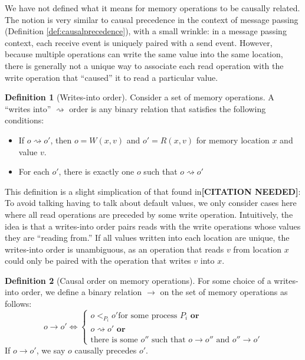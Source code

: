 \documentclass[]             %
{NASA}                       %
\theoremstyle{definition}
\newtheorem{definition}{Definition}[section]
\newcommand{\citationneeded}{\textbf{[CITATION NEEDED]}}
\begin{document}
We have not defined what it means for memory operations to be causally
related. The notion is very similar to causal precedence in the
context of message passing (Definition \ref{def:causalprecedence}),
with a small wrinkle: in a message passing context, each receive event
is uniquely paired with a send event. However, because multiple
operations can write the same value into the same location, there is
generally not a unique way to associate each read operation with the
write operation that ``caused'' it to read a particular value.

\begin{definition}[Writes-into order]
  Consider a set of memory operations. A ``writes into''
  $\rightsquigarrow$ order is any binary relation that satisfies the
  following conditions:
  \begin{itemize}
  \item If $o \rightsquigarrow o'$, then $o = W(x, v)$ and $o' = R(x,v)$ for memory location $x$ and value $v$.
  \item For each $o'$, there is exactly one $o$ such that $o \rightsquigarrow o'$
  \end{itemize}
\end{definition}

This definition is a slight simplication of that found
in\citationneeded: To avoid talking having to talk about default
values, we only consider cases here where all read operations are
preceded by some write operation. Intuitively, the idea is that a
writes-into order pairs reads with the write operations whose values
they are ``reading from.'' If all values written into each location
are unique, the writes-into order is unambiguous, as an operation that
reads $v$ from location $x$ could only be paired with the operation
that writes $v$ into $x$.

\begin{definition}[Causal order on memory operations]
  \label{def:memorycausalprecedence}
  For some choice of a writes-into order, we define a binary relation
  $\to$ on the set of memory operations as follows:
  \[o \to o' \iff
  \begin{cases}
    o <_{P_i} o' \textrm{for some process $P_i$}
    \textbf{ or} \\
    o \rightsquigarrow o'
    \textbf{ or} \\
    \textrm{there is some } o'' \textrm{ such that } o \to o'' \textrm{ and } o'' \to o'
  \end{cases}
  \]
  If $o \to o'$, we say $o$ causally precedes $o'$.
\end{definition}
\end{document}
